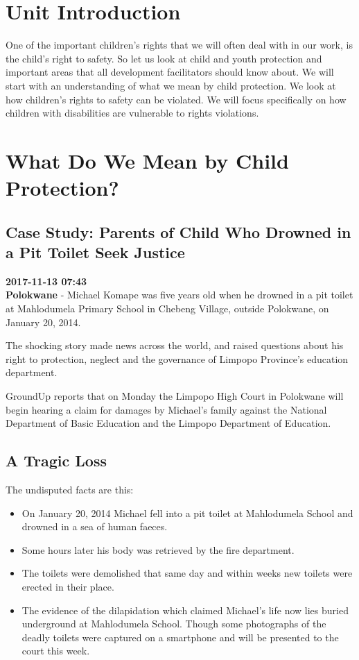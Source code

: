 \documentclass[12pt,a4paper]{article}
\begin{document}
\section*{Unit Introduction}
One of the important children’s rights that we will often deal with in our work, is the child’s right to safety. So let us look at child and youth protection and important areas that all development facilitators should know about. We will start with an understanding of what we mean by child protection. We look at how children’s rights to safety can be violated. We will focus specifically on how children with disabilities are vulnerable to rights violations.

\section*{What Do We Mean by Child Protection?}

\subsection*{Case Study: Parents of Child Who Drowned in a Pit Toilet Seek Justice}
\textbf{2017-11-13 07:43} \\

\textbf{Polokwane} - Michael Komape was five years old when he drowned in a pit toilet at Mahlodumela Primary School in Chebeng Village, outside Polokwane, on January 20, 2014.

The shocking story made news across the world, and raised questions about his right to protection, neglect and the governance of Limpopo Province's education department.

GroundUp reports that on Monday the Limpopo High Court in Polokwane will begin hearing a claim for damages by Michael's family against the National Department of Basic Education and the Limpopo Department of Education.

\subsection*{A Tragic Loss}
The undisputed facts are this:
\begin{itemize}
    \item On January 20, 2014 Michael fell into a pit toilet at Mahlodumela School and drowned in a sea of human faeces.
    \item Some hours later his body was retrieved by the fire department.
    \item The toilets were demolished that same day and within weeks new toilets were erected in their place.
    \item The evidence of the dilapidation which claimed Michael's life now lies buried underground at Mahlodumela School. Though some photographs of the deadly toilets were captured on a smartphone and will be presented to the court this week.
\end{itemize}
\end{document}

